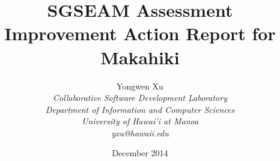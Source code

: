 \documentclass[11pt]{article}
\begin{document}
\title{SGSEAM Assessment Improvement Action Report for Makahiki}

\author{
	 Yongwen Xu \\
\em  Collaborative Software Development Laboratory \\
\em  Department of Information and Computer Sciences \\
\em  University of Hawai'i at Manoa\\
     yxu@hawaii.edu \\
}

\date{December 2014}
\maketitle

\tableofcontents

\graphicspath{{figures/}} 





\end{document}
